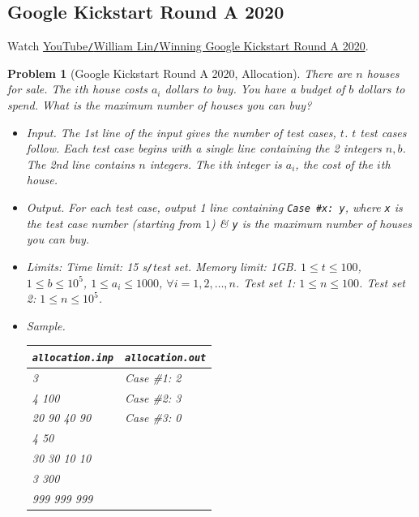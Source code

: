 \documentclass{article}
\newtheorem{problem}{Problem}
\begin{document}

\subsection{Google Kickstart Round A 2020}
Watch \href{https://www.youtube.com/watch?v=uGrBHohIgQY}{YouTube{\tt/}William Lin{\tt/}Winning Google Kickstart Round A 2020}.

\begin{problem}[Google Kickstart Round A 2020, Allocation]
	There are $n$ houses for sale. The $i$th house costs $a_i$ dollars to buy. You have a budget of $b$ dollars to spend. What is the maximum number of houses you can buy?
	\begin{itemize}
		\item {\sf Input.} The 1st line of the input gives the number of test cases, $t$. $t$ test cases follow. Each test case begins with a single line containing the 2 integers $n,b$. The 2nd line contains $n$ integers. The $i$th integer is $a_i$, the cost of the $i$th house.
		\item {\sf Output.} For each test case, output 1 line containing \verb|Case #x: y|, where {\tt x} is the test case number (starting from $1$) \& {\tt y} is the maximum number of houses you can buy.
		\item {\sf Limits:} Time limit: \emph{15 s{\tt/}test set}. Memory limit: \emph{1GB}. $1\le t\le100$, $1\le b\le10^5$, $1\le a_i\le1000$, $\forall i = 1,2,\ldots,n$. Test set 1: $1\le n\le100$. Test set 2: $1\le n\le10^5$.
		\item {\sf Sample.}
		\begin{table}[H]
			\centering
			\begin{tabular}{|l|l|}
				\hline
				{\tt allocation.inp} & {\tt allocation.out} \\
				\hline
				3 & Case \#1: 2 \\
				4 100 & Case \#2: 3 \\
				20 90 40 90 & Case \#3: 0 \\
				4 50 & \\
				30 30 10 10 & \\
				3 300 & \\
				999 999 999 & \\
				\hline
			\end{tabular}
		\end{table}
	\end{itemize}
\end{problem}
\end{document}
